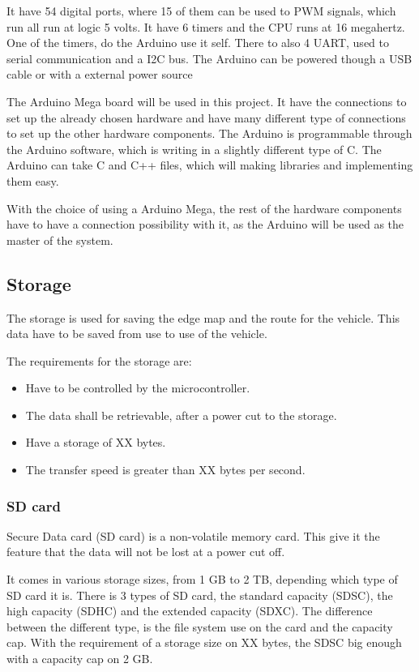 It have 54 digital ports, where 15 of them can be used to PWM signals, which run all run at logic 5 volts. It have 6 timers and the CPU runs at 16 megahertz. One of the timers, do the Arduino use it self. There to also 4 UART, used to serial communication and a I2C bus. The Arduino can be powered though a USB cable or with a external power source

The Arduino Mega board will be used in this project. It have the connections to set up the already chosen hardware and have many different type of connections to set up the other hardware components. The Arduino is programmable through the Arduino software, which is writing in a slightly different type of C. The Arduino can take C and C++ files, which will making libraries and implementing them easy. 


With the choice of using a Arduino Mega, the rest of the hardware components have to have a connection possibility with it, as the Arduino will be used as the master of the system. 



\subsection{Storage}
The storage is used for saving the edge map and the route for the vehicle. This data have to be saved from use to use of the vehicle. 

The requirements for the storage are:
\begin{itemize}
\item Have to be controlled by the microcontroller.
\item The data shall be retrievable, after a power cut to the storage.
\item Have a storage of XX bytes. 
\item The transfer speed is greater than XX bytes per second. 
\end{itemize}

\subsubsection{SD card} \label{SDcard}
Secure Data card (SD card) is a non-volatile memory card. This give it the feature that the data will not be lost at a power cut off. 

It comes in various storage sizes, from 1 GB to 2 TB, depending which type of SD card it is. There is 3 types of SD card, the standard capacity (SDSC), the high capacity (SDHC) and the extended capacity (SDXC). The  difference between the different type, is the file system use on the card and the capacity cap. With the requirement of a storage size on XX bytes, the SDSC big enough with a capacity cap on 2 GB. 

